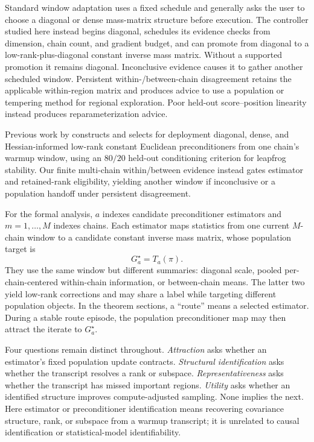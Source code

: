 \documentclass[11pt]{article}
\theoremstyle{plain}
\theoremstyle{definition}
\theoremstyle{remark}
\begin{document}
Standard window adaptation uses a fixed schedule and generally asks the user to
choose a diagonal or dense mass-matrix structure before execution. The
controller studied here instead begins diagonal, schedules its evidence checks
from dimension, chain count, and gradient budget, and can promote from diagonal
to a low-rank-plus-diagonal constant inverse mass matrix. Without a supported
promotion it remains diagonal. Inconclusive evidence causes it to gather
another scheduled window. Persistent within-/between-chain disagreement
retains the applicable within-region matrix and produces advice to use a
population or tempering method for regional exploration. Poor held-out
score--position linearity instead produces reparameterization advice.

Previous work by \citet{bales2019selecting} constructs and selects for deployment
diagonal, dense, and Hessian-informed low-rank constant Euclidean preconditioners
from one chain's warmup window, using an $80/20$ held-out conditioning criterion
for leapfrog stability. Our finite multi-chain within/between evidence instead
gates estimator and retained-rank eligibility, yielding another window if
inconclusive or a population handoff under persistent disagreement.

For the formal analysis, $a$ indexes candidate preconditioner estimators and
$m=1,\ldots,M$ indexes chains. Each estimator maps statistics from one current
$M$-chain window to a candidate constant inverse mass matrix, whose population
target is
\[
  G_a^\star=T_a(\pi).
\]
They use the same window but different summaries: diagonal scale, pooled
per-chain-centered within-chain information, or between-chain means. The latter
two yield low-rank corrections and may share a label while targeting different
population objects. In the theorem sections, a ``route'' means a selected
estimator. During a stable route episode, the population preconditioner map may
then attract the iterate to $G_a^\star$.

Four questions remain distinct throughout. \emph{Attraction} asks whether an
estimator's fixed population update contracts. \emph{Structural
identification} asks whether the transcript resolves a rank or subspace.
\emph{Representativeness} asks whether the transcript has missed important
regions. \emph{Utility} asks whether an identified structure improves
compute-adjusted sampling. None implies the next.
Here estimator or preconditioner identification means recovering covariance
structure, rank, or subspace from a warmup transcript; it is unrelated to
causal identification or statistical-model identifiability.
\end{document}
